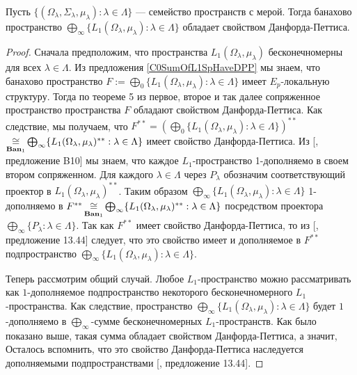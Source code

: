 \begin{proposition}\label{ProdOfL1SpHaveDPP} Пусть $\{(\Omega_\lambda,\Sigma_\lambda,\mu_\lambda):\lambda\in\Lambda\}$ --- семейство пространств с мерой. Тогда банахово пространство $\bigoplus_\infty\{L_1(\Omega_\lambda,\mu_\lambda):\lambda\in\Lambda\}$ обладает свойством Данфорда-Петтиса.
\end{proposition}
\begin{proof} Сначала предположим, что пространства $L_1(\Omega_\lambda, \mu_\lambda)$ бесконечномерны для всех $\lambda\in\Lambda$. Из предложения \ref{C0SumOfL1SpHaveDPP} мы знаем, что банахово пространство $F:=\bigoplus_0\{L_1(\Omega_\lambda,\mu_\lambda):\lambda\in\Lambda\}$ имеет $E_{p}$-локальную структуру. Тогда по теореме 5 из \cite{BourgOnTheDPP} первое, второе и так далее сопряженное пространство пространства $F$ обладают свойством Данфорда-Петтиса. Как следствие, мы получаем, что $F^{**}=\left(\bigoplus_0\{L_1(\Omega_\lambda,\mu_\lambda):\lambda\in\Lambda\}\right)^{**}$ $\mathop{\mathbin{\cong}}\limits_{\mathbf{Ban}_1}\bigoplus_\infty\{L_1(\Omega_\lambda,\mu_\lambda)^{**}:\lambda\in\Lambda\}$ имеет свойство Данфорда-Петтиса. Из [\cite{DefFloTensNorOpId}, предложение B10] мы знаем, что каждое $L_1$-пространство 1-дополняемо в своем втором сопряженном. Для каждого $\lambda\in\Lambda$ через $P_\lambda$ обозначим соответствующий проектор в $L_1(\Omega_\lambda,\mu_\lambda)^{**}$. Таким образом $\bigoplus_\infty\{L_1(\Omega_\lambda,\mu_\lambda):\lambda\in\Lambda\}$ 1-дополняемо в $F^{**}\mathop{\mathbin{\cong}}\limits_{\mathbf{Ban}_1}\bigoplus_\infty\{L_1(\Omega_\lambda,\mu_\lambda)^{**}:\lambda\in\Lambda\}$ посредством проектора $\bigoplus_\infty \{P_\lambda:\lambda\in\Lambda\}$. Так как $F^{**}$ имеет свойство Данфорда-Петтиса, то из [\cite{FabHabBanSpTh}, предложение 13.44] следует, что это свойство имеет и дополняемое в $F^{**}$ подпространство $\bigoplus_\infty\{L_1(\Omega_\lambda,\mu_\lambda):\lambda\in\Lambda\}$.

Теперь рассмотрим общий случай. Любое $L_1$-пространство можно рассматривать как $1$-дополняемое подпространство некоторого бесконечномерного $L_1$-пространства. Как следствие, пространство $\bigoplus_\infty\{L_1(\Omega_\lambda,\mu_\lambda):\lambda\in\Lambda\}$ будет $1$-дополняемо в $\bigoplus_\infty$-сумме бесконечномерных $L_1$-пространств. Как было показано выше, такая сумма обладает свойством Данфорда-Петтиса, а значит,  Осталось вспомнить, что это свойство Данфорда-Петтиса наследуется дополняемыми подпространствами [\cite{FabHabBanSpTh}, предложение 13.44].
\end{proof}

